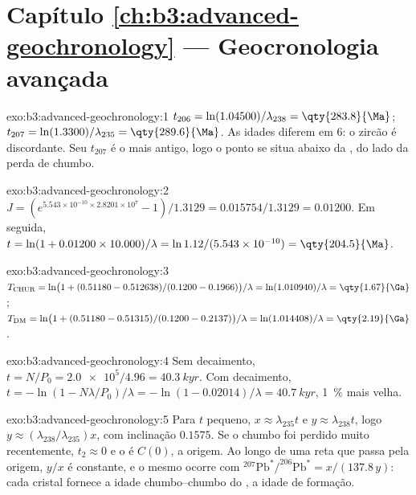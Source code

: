\section*{Capítulo \ref{ch:b3:advanced-geochronology} --- Geocronologia avançada}

\begin{solution}{exo:b3:advanced-geochronology:1}
$t_{206} = \ln(1.04500)/\lambda_{238} = \qty{283.8}{\Ma}$; $t_{207} =
\ln(1.3300)/\lambda_{235} = \qty{289.6}{\Ma}$. As idades diferem em
\qty{6}{\Ma}: o zircão é discordante. Seu $t_{207}$ é o mais antigo, logo o ponto se situa
abaixo da , do lado da perda de chumbo.
\end{solution}

\begin{solution}{exo:b3:advanced-geochronology:2}
$J = (e^{5.543\times10^{-10}\times2.8201\times10^7} - 1)/1.3129 =
0.015754/1.3129 = 0.01200$. Em seguida, $t = \ln(1 + 0.01200\times10.000)/\lambda =
\ln 1.12/(5.543\times10^{-10}) = \qty{204.5}{\Ma}$.
\end{solution}

\begin{solution}{exo:b3:advanced-geochronology:3}
$T_{\mathrm{CHUR}} = \ln\bigl(1 + (0.51180 - 0.512638)/(0.1200 -
0.1966)\bigr)/\lambda = \ln(1.010940)/\lambda = \qty{1.67}{\Ga}$;
$T_{\mathrm{DM}} = \ln\bigl(1 + (0.51180 - 0.51315)/(0.1200 - 0.2137)\bigr)/\lambda
= \ln(1.014408)/\lambda = \qty{2.19}{\Ga}$.
\end{solution}

\begin{solution}{exo:b3:advanced-geochronology:4}
Sem decaimento, $t = N/P_0 = \num{2.0e5}/4.96 = \qty{40.3}{kyr}$. Com decaimento,
$t = -\ln(1 - N\lambda/P_0)/\lambda = -\ln(1 - 0.02014)/\lambda =
\qty{40.7}{kyr}$, \qty{1}{\percent} mais velha.
\end{solution}

\begin{solution}{exo:b3:advanced-geochronology:5}
Para $t$ pequeno, $x \approx \lambda_{235}t$ e $y \approx \lambda_{238}t$, logo
$y \approx (\lambda_{238}/\lambda_{235})x$, com inclinação $0.1575$. Se o chumbo foi
perdido muito recentemente, $t_2 \approx 0$ e o  é $C(0)$, a
origem. Ao longo de uma reta que passa pela origem, $y/x$ é constante, e o mesmo ocorre com
$^{207}\mathrm{Pb}^*/^{206}\mathrm{Pb}^* = x/(137.8\,y)$: cada cristal fornece
a idade chumbo--chumbo do , a idade de formação.
\end{solution}

